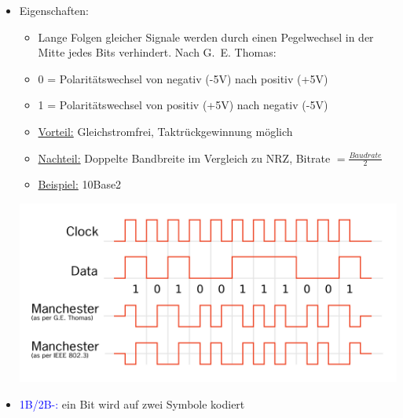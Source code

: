 \begin{itemize}
    \item Eigenschaften:
    \begin{itemize}
        \item Lange Folgen gleicher Signale werden durch einen Pegelwechsel in
        der Mitte jedes Bits verhindert.
        Nach G.\ E. Thomas:
        \item 0 = Polaritätswechsel von negativ (-5V) nach positiv (+5V)
        \item 1 = Polaritätswechsel von positiv (+5V) nach negativ (-5V)
        \item \underline{Vorteil:} Gleichstromfrei, Taktrückgewinnung möglich
        \item \underline{Nachteil:} Doppelte Bandbreite im Vergleich zu NRZ, Bitrate $= \frac{Baudrate}{2}$
        \item \underline{Beispiel:} 10Base2
    \end{itemize}
    \includegraphics[width=\textwidth]{img/Manchester-Code}
    \item \textcolor{blue}{1B/2B-:} ein Bit wird auf zwei Symbole kodiert
\end{itemize}

